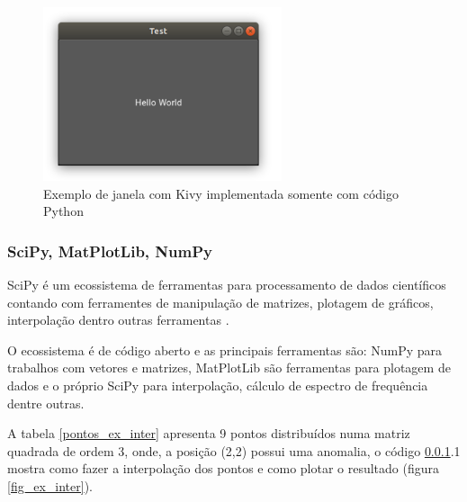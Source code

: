             \begin{figure}[h]
                \caption{Exemplo de janela com Kivy implementada somente com código Python}
                \begin{center}
                    \includegraphics[width=7cm]{texto/fig/hello_world_kivy.png} 
                \end{center}
                \label{janela_kivy} 
            \end{figure}


            
            \subsubsection{SciPy, MatPlotLib, NumPy}
            \label{lim_scipy}
            
            SciPy é um ecossistema de ferramentas para processamento de dados científicos contando com ferramentes de manipulação de matrizes, plotagem de gráficos, interpolação dentro outras ferramentas \cite{scipy}.
            
            O ecossistema é de código aberto e as principais ferramentas são: NumPy para trabalhos com vetores e matrizes, MatPlotLib são ferramentas para plotagem de dados e o próprio SciPy para interpolação, cálculo de espectro de frequência dentre outras.
            
            A tabela \ref{pontos_ex_inter} apresenta 9 pontos distribuídos numa matriz quadrada de ordem 3, onde, a posição (2,2) possui uma anomalia, o código \ref{lim_scipy}.1 mostra como fazer a interpolação dos pontos e como plotar o resultado (figura \ref{fig_ex_inter}).
            
